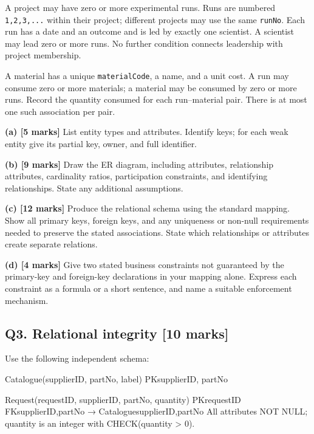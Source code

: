 A project may have zero or more experimental runs. Runs are numbered \texttt{1,\allowbreak{}2,\allowbreak{}3,\allowbreak{}.\allowbreak{}.\allowbreak{}.\allowbreak{}} within their project; different projects may use the same \texttt{runNo}. Each run has a date and an outcome and is led by exactly one scientist. A scientist may lead zero or more runs. No further condition connects leadership with project membership.

A material has a unique \texttt{materialCode}, a name, and a unit cost. A run may consume zero or more materials; a material may be consumed by zero or more runs. Record the quantity consumed for each run--material pair. There is at most one such association per pair.

\textbf{(a) {[}5 marks{]}} List entity types and attributes. Identify keys; for each weak entity give its partial key, owner, and full identifier.

\textbf{(b) {[}9 marks{]}} Draw the ER diagram, including attributes, relationship attributes, cardinality ratios, participation constraints, and identifying relationships. State any additional assumptions.

\textbf{(c) {[}12 marks{]}} Produce the relational schema using the standard mapping. Show all primary keys, foreign keys, and any uniqueness or non-null requirements needed to preserve the stated associations. State which relationships or attributes create separate relations.

\textbf{(d) {[}4 marks{]}} Give two stated business constraints not guaranteed by the primary-key and foreign-key declarations in your mapping alone. Express each constraint as a formula or a short sentence, and name a suitable enforcement mechanism.

\subsection{Q3. Relational integrity {[}10 marks{]}}\label{practice_paper_1-q3.-relational-integrity-10-marks}

Use the following independent schema:

\begin{StudyCode}
Catalogue(supplierID, partNo, label)
  PK{supplierID, partNo}

Request(requestID, supplierID, partNo, quantity)
  PK{requestID}
  FK{supplierID,partNo} → Catalogue{supplierID,partNo}
  All attributes NOT NULL; quantity is an integer with CHECK(quantity > 0).
\end{StudyCode}

